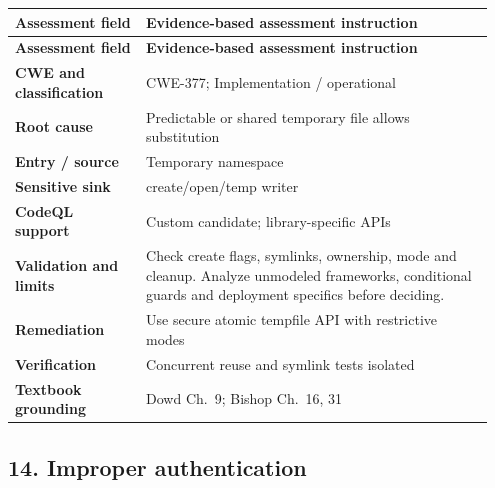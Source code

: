 \documentclass[11pt,letterpaper,oneside]{book}
\begin{document}
\small
\setlength{\tabcolsep}{2pt}
\renewcommand{\arraystretch}{1.18}
\begin{longtable}{>{\raggedright\arraybackslash}p{0.26\linewidth}>{\raggedright\arraybackslash}p{0.69\linewidth}}
\toprule
\textbf{Assessment field} & \textbf{Evidence-based assessment instruction}\\
\midrule
\endfirsthead
\toprule
\textbf{Assessment field} & \textbf{Evidence-based assessment instruction}\\
\midrule
\endhead
\textbf{CWE and classification} & CWE-377; Implementation / operational\\
\textbf{Root cause} & Predictable or shared temporary file allows substitution\\
\textbf{Entry / source} & Temporary namespace\\
\textbf{Sensitive sink} & create/open/temp writer\\
\textbf{CodeQL support} & Custom candidate; library-specific APIs\\
\textbf{Validation and limits} & Check create flags, symlinks, ownership, mode and cleanup. Analyze unmodeled frameworks, conditional guards and deployment specifics before deciding.\\
\textbf{Remediation} & Use secure atomic tempfile API with restrictive modes\\
\textbf{Verification} & Concurrent reuse and symlink tests isolated\\
\textbf{Textbook grounding} & Dowd Ch.~9; Bishop Ch.~16, 31\\
\bottomrule
\end{longtable}
\normalsize

\subsection{14. Improper authentication}
\end{document}
